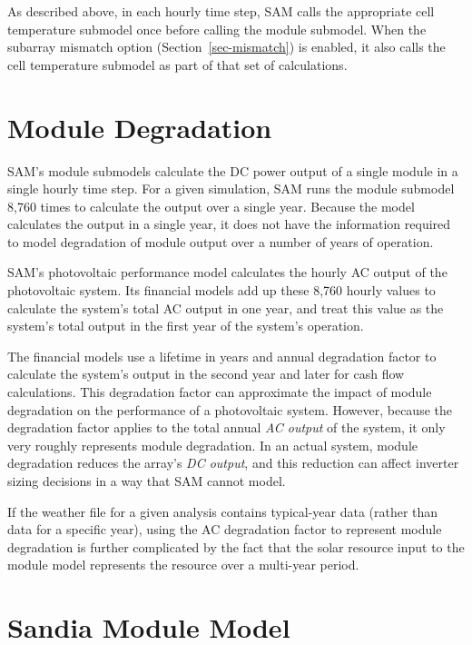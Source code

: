 \documentclass[12pt,letterpaper]{article}
\begin{document}
As described above, in each hourly time step, SAM calls the appropriate cell temperature submodel once before calling the module submodel. When the subarray mismatch option (Section~\ref{sec-mismatch}) is enabled, it also calls the cell temperature submodel as part of that set of calculations.

\section{Module Degradation}

SAM's module submodels calculate the DC power output of a single module in a single hourly time step. For a given simulation, SAM runs the module submodel 8,760 times to calculate the output over a single year. Because the model calculates the output in a single year, it does not have the information required to model degradation of module output over a number of years of operation.

SAM's photovoltaic performance model calculates the hourly AC output of the photovoltaic system. Its financial models add up these 8,760 hourly values to calculate the system's total AC output in one year, and treat this value as the system's total output in the first year of the system's operation.

The financial models use a lifetime in years and annual degradation factor to calculate the system's output in the second year and later for cash flow calculations. This degradation factor can approximate the impact of module degradation on the performance of a photovoltaic system. However, because the degradation factor applies to the total annual \textit{AC output} of the system, it only very roughly represents module degradation. In an actual system, module degradation reduces the array's \textit{DC output}, and this reduction can affect inverter sizing decisions in a way that SAM cannot model.

If the weather file for a given analysis contains typical-year data (rather than data for a specific year), using the AC degradation factor to represent module degradation is further complicated by the fact that the solar resource input to the module model represents the resource over a multi-year period.

\section{Sandia Module Model}\label{sec-sandiamodule}
\end{document}
